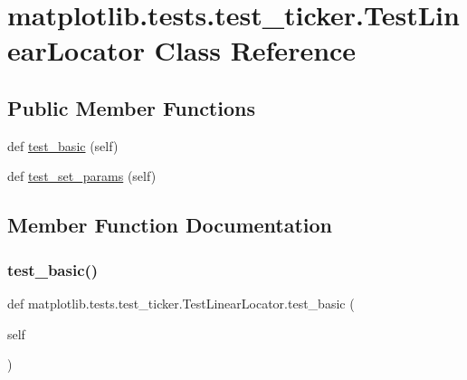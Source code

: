 \hypertarget{classmatplotlib_1_1tests_1_1test__ticker_1_1TestLinearLocator}{}\section{matplotlib.\+tests.\+test\+\_\+ticker.\+Test\+Linear\+Locator Class Reference}
\label{classmatplotlib_1_1tests_1_1test__ticker_1_1TestLinearLocator}
\subsection*{Public Member Functions}
\begin{DoxyCompactItemize}
\item 
def \hyperlink{classmatplotlib_1_1tests_1_1test__ticker_1_1TestLinearLocator_a79eca9391de15ade0083b6a2c93f116a}{test\+\_\+basic} (self)
\item 
def \hyperlink{classmatplotlib_1_1tests_1_1test__ticker_1_1TestLinearLocator_ab6a0adf9a5969ef0c42fd9cc28064293}{test\+\_\+set\+\_\+params} (self)
\end{DoxyCompactItemize}


\subsection{Member Function Documentation}
\mbox{\label{classmatplotlib_1_1tests_1_1test__ticker_1_1TestLinearLocator_a79eca9391de15ade0083b6a2c93f116a}} 
\subsubsection{\texorpdfstring{test\+\_\+basic()}{test\_basic()}}
{\footnotesize\ttfamily def matplotlib.\+tests.\+test\+\_\+ticker.\+Test\+Linear\+Locator.\+test\+\_\+basic (\begin{DoxyParamCaption}\item[{}]{self }\end{DoxyParamCaption})}

